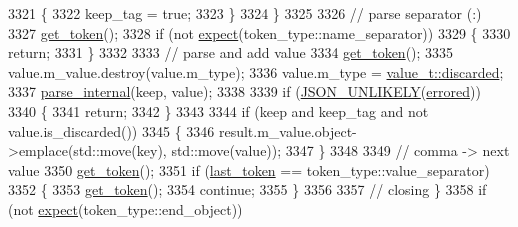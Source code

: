 \begin{DoxyCode}
3321                         \{
3322                             keep\_tag = \textcolor{keyword}{true};
3323                         \}
3324                     \}
3325 
3326                     \textcolor{comment}{// parse separator (:)}
3327                     \hyperlink{classnlohmann_1_1detail_1_1parser_a33f3859d0dd402445b5859070fd24bab}{get\_token}();
3328                     \textcolor{keywordflow}{if} (not \hyperlink{classnlohmann_1_1detail_1_1parser_a9abcc7b005c70ee67ce669c398273516}{expect}(token\_type::name\_separator))
3329                     \{
3330                         \textcolor{keywordflow}{return};
3331                     \}
3332 
3333                     \textcolor{comment}{// parse and add value}
3334                     \hyperlink{classnlohmann_1_1detail_1_1parser_a33f3859d0dd402445b5859070fd24bab}{get\_token}();
3335                     value.m\_value.destroy(value.m\_type);
3336                     value.m\_type = \hyperlink{namespacenlohmann_1_1detail_a1ed8fc6239da25abcaf681d30ace4985a94708897ec9db8647dfe695714c98e46}{value\_t::discarded};
3337                     \hyperlink{classnlohmann_1_1detail_1_1parser_ace714b4bfb791f97050e0b380d2b50c3}{parse\_internal}(keep, value);
3338 
3339                     \textcolor{keywordflow}{if} (\hyperlink{json_8hpp_ab77582407c64944e7db1ea95ab520253}{JSON\_UNLIKELY}(\hyperlink{classnlohmann_1_1detail_1_1parser_af6a116454a868ebb6628c6137c3dd77d}{errored}))
3340                     \{
3341                         \textcolor{keywordflow}{return};
3342                     \}
3343 
3344                     \textcolor{keywordflow}{if} (keep and keep\_tag and not value.is\_discarded())
3345                     \{
3346                         result.m\_value.object->emplace(std::move(key), std::move(value));
3347                     \}
3348 
3349                     \textcolor{comment}{// comma -> next value}
3350                     \hyperlink{classnlohmann_1_1detail_1_1parser_a33f3859d0dd402445b5859070fd24bab}{get\_token}();
3351                     \textcolor{keywordflow}{if} (\hyperlink{classnlohmann_1_1detail_1_1parser_a932e49f6f4d291557846744319245994}{last\_token} == token\_type::value\_separator)
3352                     \{
3353                         \hyperlink{classnlohmann_1_1detail_1_1parser_a33f3859d0dd402445b5859070fd24bab}{get\_token}();
3354                         \textcolor{keywordflow}{continue};
3355                     \}
3356 
3357                     \textcolor{comment}{// closing \}}
3358                     \textcolor{keywordflow}{if} (not \hyperlink{classnlohmann_1_1detail_1_1parser_a9abcc7b005c70ee67ce669c398273516}{expect}(token\_type::end\_object))

\end{DoxyCode}
